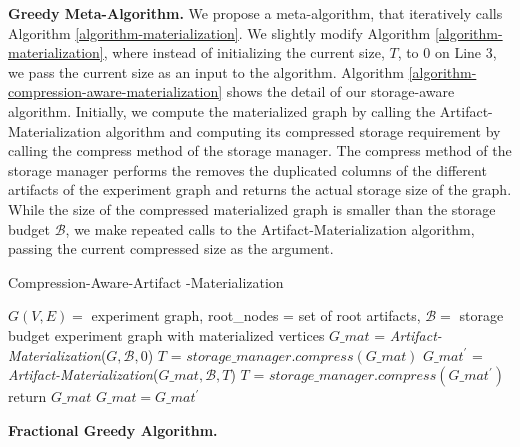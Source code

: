 \textbf{Greedy Meta-Algorithm.}
We propose a meta-algorithm, that iteratively calls Algorithm \ref{algorithm-materialization}.
We slightly modify Algorithm \ref{algorithm-materialization}, where instead of initializing the current size, $T$, to 0 on Line 3, we pass the current size as an input to the algorithm. 
Algorithm \ref{algorithm-compression-aware-materialization} shows the detail of our storage-aware algorithm.
Initially, we compute the materialized graph by calling the Artifact-Materialization algorithm and computing its compressed storage requirement by calling the compress method of the storage manager.
The compress method of the storage manager performs the removes the duplicated columns of the different artifacts of the experiment graph and returns the actual storage size of the graph.
While the size of the compressed materialized graph is smaller than the storage budget $\mathcal{B}$, we make repeated calls to the Artifact-Materialization algorithm, passing the current compressed size as the argument.
\begin{algorithm}[h]
\caption{Compression-Aware-Artifact -Materialization}\label{algorithm-compression-aware-materialization}
\begin{algorithmic}[1]
\Require  $G(V,E)=$ experiment graph, root\_nodes = set of root artifacts, $\mathcal{B}=$ storage budget
\Ensure experiment graph with materialized vertices
\State $G\_mat$ = \textit{Artifact-Materialization}($G, \mathcal{B}, 0$)
\State $T$ = $storage\_manager.compress(G\_mat)$
	\State $G\_mat^\prime$  = \textit{Artifact-Materialization}($G\_mat, \mathcal{B}, T$)
	\State $T$ = $storage\_manager.compress(G\_mat^\prime)$
		\State return $G\_mat$
	\Else
		 \State $G\_mat = G\_mat^\prime$
	\EndIf
\EndWhile
\end{algorithmic}
\end{algorithm}

\textbf{Fractional Greedy Algorithm.}
